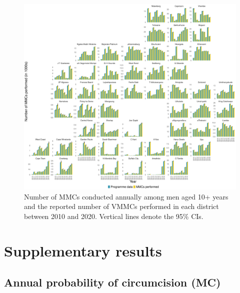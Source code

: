 \documentclass{article}
\begin{document}
\begin{appendix}

\begin{figure}[H]
	\centering
	\includegraphics[width = \linewidth]{Figures/suppmat/VMMCs/MMCsComparison_District}
	\caption{Number of MMCs conducted annually among men aged 10+ years and the reported number of VMMCs performed in each district between 2010 and 2020. Vertical lines denote the 95\% CIs.}
\end{figure}


\section{Supplementary results}


\subsection{Annual probability of circumcision (MC)}



\end{appendix}
\end{document}
